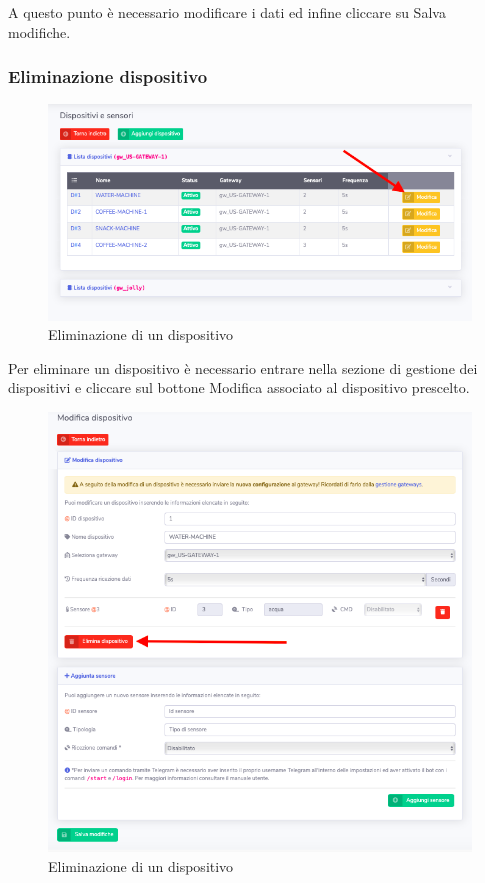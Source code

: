 		A questo punto è necessario modificare i dati ed infine cliccare su Salva modifiche. 

	\subsubsection{Eliminazione dispositivo}	

		\begin{figure}[H]
		\centering
		\includegraphics[scale=0.600]{res/images/admin/selModDisp.png}
		\caption{Eliminazione di un dispositivo}
	\end{figure}


		Per eliminare un dispositivo è necessario entrare nella sezione di gestione dei dispositivi e cliccare sul bottone Modifica associato al dispositivo prescelto. 

		\begin{figure}[H]
		\centering
		\includegraphics[scale=0.600]{res/images/admin/elimDisp.png}
		\caption{Eliminazione di un dispositivo}
	\end{figure}


